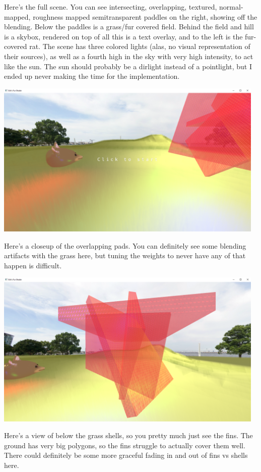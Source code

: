 \documentclass[a4paper, 12pt]{article}
\begin{document}
    Here's the full scene.
    You can see intersecting,
    overlapping, textured, normal-mapped, roughness mapped semitransparent paddles on the right,
    showing off the blending.
    Below the paddles is a grass/fur covered field.
    Behind the field and hill is a skybox,
    rendered on top of all this is a text overlay,
    and to the left is the fur-covered rat.
    The scene has three colored lights
    (alas, no visual representation of their sources),
    as well as a fourth high in the sky with very high intensity,
    to act like the sun.
    The sun should probably be a dirlight instead of a pointlight,
    but I ended up never making the time for the implementation.


    \includegraphics[width=35em]{fullscene}

    Here's a closeup of the overlapping pads.
    You can definitely see some blending artifacts with the grass here,
    but tuning the weights to never have any of that happen is difficult.

    \includegraphics[width=35em]{overlap}

    Here's a view of below the grass shells,
    so you pretty much just see the fins.
    The ground has very big polygons, so the fins struggle to actually cover them well.
    There could definitely be some more graceful fading in and out of fins vs shells here.
\end{document}
